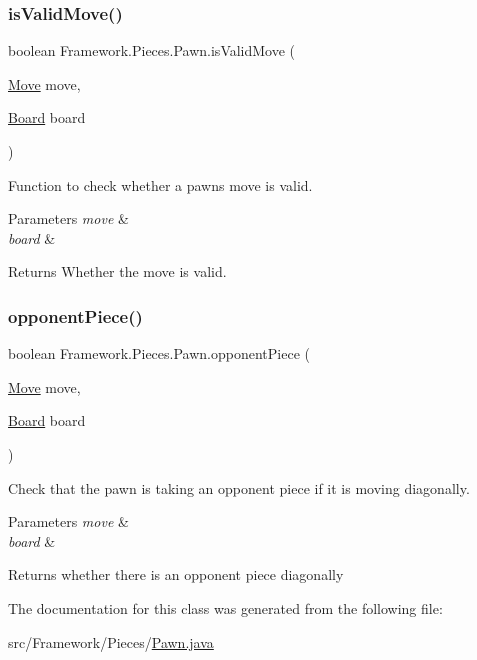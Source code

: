 \subsubsection{\texorpdfstring{is\+Valid\+Move()}{isValidMove()}}
{\footnotesize\ttfamily boolean Framework.\+Pieces.\+Pawn.\+is\+Valid\+Move (\begin{DoxyParamCaption}\item[{\hyperlink{class_framework_1_1_move}{Move}}]{move,  }\item[{\hyperlink{class_framework_1_1_board}{Board}}]{board }\end{DoxyParamCaption})}

Function to check whether a pawn\textquotesingle{}s move is valid. 
\begin{DoxyParams}{Parameters}
{\em move} & \\
\hline
{\em board} & \\
\hline
\end{DoxyParams}
\begin{DoxyReturn}{Returns}
Whether the move is valid. 
\end{DoxyReturn}
\hypertarget{class_framework_1_1_pieces_1_1_pawn_aab0b976104c3c3c0f97bd27facb274b6}{}\label{class_framework_1_1_pieces_1_1_pawn_aab0b976104c3c3c0f97bd27facb274b6} 
\subsubsection{\texorpdfstring{opponent\+Piece()}{opponentPiece()}}
{\footnotesize\ttfamily boolean Framework.\+Pieces.\+Pawn.\+opponent\+Piece (\begin{DoxyParamCaption}\item[{\hyperlink{class_framework_1_1_move}{Move}}]{move,  }\item[{\hyperlink{class_framework_1_1_board}{Board}}]{board }\end{DoxyParamCaption})}

Check that the pawn is taking an opponent piece if it is moving diagonally. 
\begin{DoxyParams}{Parameters}
{\em move} & \\
\hline
{\em board} & \\
\hline
\end{DoxyParams}
\begin{DoxyReturn}{Returns}
whether there is an opponent piece diagonally 
\end{DoxyReturn}


The documentation for this class was generated from the following file\+:\begin{DoxyCompactItemize}
\item 
src/\+Framework/\+Pieces/\hyperlink{_pawn_8java}{Pawn.\+java}\end{DoxyCompactItemize}
